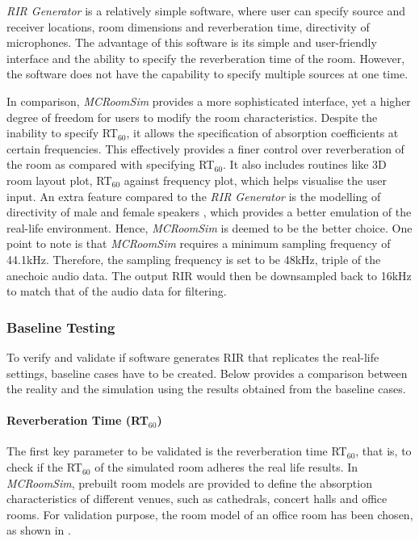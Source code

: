 \documentclass[a4paper,twoside,12pt,hidelinks]{article}
\begin{document}
\textit{RIR Generator} is a relatively simple software, where user can specify source and receiver locations, room dimensions and reverberation time, directivity of microphones. The advantage of this software is its simple and user-friendly interface and the ability to specify the reverberation time of the room. However, the software does not have the capability to specify multiple sources at one time. 

In comparison, \textit{MCRoomSim} provides a more sophisticated interface, yet a higher degree of freedom for users to modify the room characteristics. Despite the inability to specify RT$_{60}$, it allows the specification of absorption coefficients at certain frequencies. This effectively provides a finer control over reverberation of the room as compared with specifying RT$_{60}$. It also includes routines like 3D room layout plot, RT$_{60}$ against frequency plot, which helps visualise the user input. An extra feature compared to the \textit{RIR Generator} is the modelling of directivity of male and female speakers \cite{Chu2002DetailedTalkers}, which provides a better emulation of the real-life environment. Hence, \textit{MCRoomSim} is deemed to be the better choice. One point to note is that \textit{MCRoomSim} requires a minimum sampling frequency of 44.1kHz. Therefore, the sampling frequency is set to be 48kHz, triple of the anechoic audio data. The output RIR would then be downsampled back to 16kHz to match that of the audio data for filtering. 

\subsubsection{Baseline Testing}
\label{testcase}
To verify and validate if software generates RIR that replicates the real-life settings, baseline cases have to be created. Below provides a comparison between the reality and the simulation using the results obtained from the baseline cases.

\paragraph{Reverberation Time (RT$_{60}$)}
The first key parameter to be validated is the reverberation time RT$_{60}$, that is, to check if the RT$_{60}$ of the simulated room adheres the real life results. In \textit{MCRoomSim}, prebuilt room models are provided to define the absorption characteristics of different venues, such as cathedrals, concert halls and office rooms. For validation purpose, the room model of an office room has been chosen, as shown in . 
\end{document}
